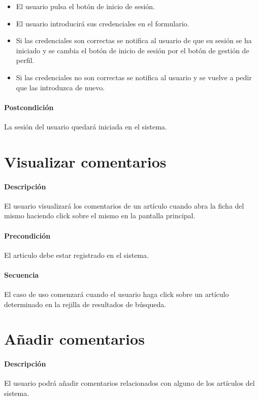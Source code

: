 \begin{itemize}
	\item El usuario pulsa el botón de inicio de sesión.
	\item El usuario introducirá sus credenciales en el formulario.
	\item Si las credenciales son correctas se notifica al usuario de que su sesión se ha iniciado y se cambia el botón de inicio de sesión por el botón de gestión de perfil.
	\item Si las credenciales no son correctas se notifica al usuario y se vuelve a pedir que las introduzca de nuevo.
\end{itemize}

\paragraph{Postcondición} La sesión del usuario quedará iniciada en el sistema.

\section{Visualizar comentarios}

\paragraph{Descripción} El usuario visualizará los comentarios de un artículo cuando abra la ficha del mismo haciendo click sobre el mismo en la pantalla principal.

\paragraph{Precondición} El articulo debe estar registrado en el sistema.

\paragraph{Secuencia} El caso de uso comenzará cuando el usuario haga click sobre un artículo determinado en la rejilla de resultados de búsqueda.

\section{Añadir comentarios}

\paragraph{Descripción} El usuario podrá añadir comentarios relacionados con alguno de los artículos del sistema.


